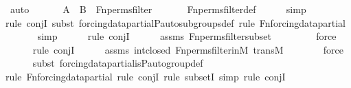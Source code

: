 \begin{isabellebody}
\ auto\isanewline
\ \ \isamarkupfalse%
\isanewline
\isanewline
\ \ \isamarkupfalse%
\ {\isachardoublequoteopen}A\ {\isasyminter}\ B\ {\isasymin}\ Fn{\isacharunderscore}{\kern0pt}perms{\isacharunderscore}{\kern0pt}filter{\isachardoublequoteclose}\ \isanewline
\ \ \ \ \isamarkupfalse%
\ Fn{\isacharunderscore}{\kern0pt}perms{\isacharunderscore}{\kern0pt}filter{\isacharunderscore}{\kern0pt}def\isanewline
\ \ \ \ \isamarkupfalse%
\ simp\isanewline
\ \ \ \ \isamarkupfalse%
{\isacharparenleft}{\kern0pt}rule\ conjI{\isacharcomma}{\kern0pt}\ subst\ forcing{\isacharunderscore}{\kern0pt}data{\isacharunderscore}{\kern0pt}partial{\isachardot}{\kern0pt}P{\isacharunderscore}{\kern0pt}auto{\isacharunderscore}{\kern0pt}subgroups{\isacharunderscore}{\kern0pt}def{\isacharcomma}{\kern0pt}\ rule\ Fn{\isacharunderscore}{\kern0pt}forcing{\isacharunderscore}{\kern0pt}data{\isacharunderscore}{\kern0pt}partial{\isacharparenright}{\kern0pt}\isanewline
\ \ \ \ \ \isamarkupfalse%
\ simp\isanewline
\ \ \ \ \ \isamarkupfalse%
{\isacharparenleft}{\kern0pt}rule\ conjI{\isacharparenright}{\kern0pt}\isanewline
\ \ \ \ \isamarkupfalse%
\ assms\ Fn{\isacharunderscore}{\kern0pt}perms{\isacharunderscore}{\kern0pt}filter{\isacharunderscore}{\kern0pt}subset\ \isanewline
\ \ \ \ \ \ \isamarkupfalse%
\ force\isanewline
\ \ \ \ \ \isamarkupfalse%
{\isacharparenleft}{\kern0pt}rule\ conjI{\isacharparenright}{\kern0pt}\isanewline
\ \ \ \ \isamarkupfalse%
\ assms\ int{\isacharunderscore}{\kern0pt}closed\ Fn{\isacharunderscore}{\kern0pt}perms{\isacharunderscore}{\kern0pt}filter{\isacharunderscore}{\kern0pt}in{\isacharunderscore}{\kern0pt}M\ transM\isanewline
\ \ \ \ \ \ \isamarkupfalse%
\ force\isanewline
\ \ \ \ \ \isamarkupfalse%
{\isacharparenleft}{\kern0pt}subst\ forcing{\isacharunderscore}{\kern0pt}data{\isacharunderscore}{\kern0pt}partial{\isachardot}{\kern0pt}is{\isacharunderscore}{\kern0pt}P{\isacharunderscore}{\kern0pt}auto{\isacharunderscore}{\kern0pt}group{\isacharunderscore}{\kern0pt}def{\isacharparenright}{\kern0pt}\isanewline
\ \ \ \ \ \ \isamarkupfalse%
{\isacharparenleft}{\kern0pt}rule\ Fn{\isacharunderscore}{\kern0pt}forcing{\isacharunderscore}{\kern0pt}data{\isacharunderscore}{\kern0pt}partial{\isacharcomma}{\kern0pt}\ rule\ conjI{\isacharcomma}{\kern0pt}\ rule\ subsetI{\isacharcomma}{\kern0pt}\ simp{\isacharcomma}{\kern0pt}\ rule\ conjI{\isacharparenright}{\kern0pt}\isanewline

\end{isabellebody}
